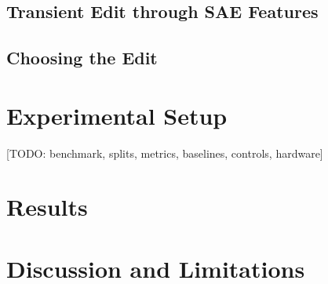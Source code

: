 \documentclass[conference]{IEEEtran}
\newcommand{\todo}[1]{{\color{red}[TODO: #1]}}
\begin{document}
\subsection{Transient Edit through SAE Features}
\subsection{Choosing the Edit}

\section{Experimental Setup}\label{sec:setup}
\todo{benchmark, splits, metrics, baselines, controls, hardware}

\section{Results}\label{sec:results}



\section{Discussion and Limitations}\label{sec:discussion}
\end{document}
